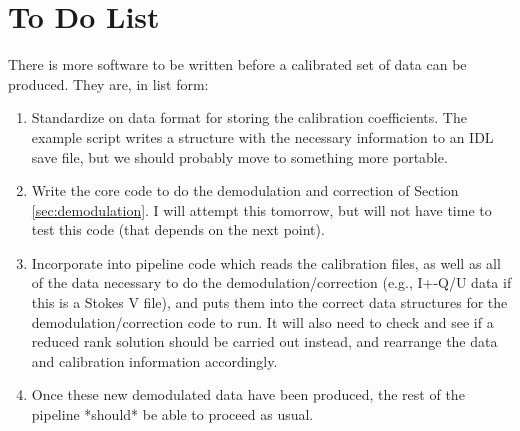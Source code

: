 \documentclass[11pt]{article}
\begin{document}
\section{To Do List}

There is more software to be written before a calibrated set of data can be produced. They are, in list form:
\begin{enumerate}
	\item Standardize on data format for storing the calibration coefficients. The example script writes a structure with the necessary information to an IDL save file, but we should probably move to something more portable.
	\item Write the core code to do the demodulation and correction of Section \ref{sec:demodulation}. I will attempt this tomorrow, but will not have time to test this code (that depends on the next point).
	\item Incorporate into pipeline code which reads the calibration files, as well as all of the data necessary to do the demodulation/correction (e.g., I+-Q/U data if this is a Stokes V file), and puts them into the correct data structures for the demodulation/correction code to run. It will also need to check and see if a reduced rank solution should be carried out instead, and rearrange the data and calibration information accordingly.
	\item Once these new demodulated data have been produced, the rest of the pipeline *should* be able to proceed as usual.
\end{enumerate}
\end{document}

